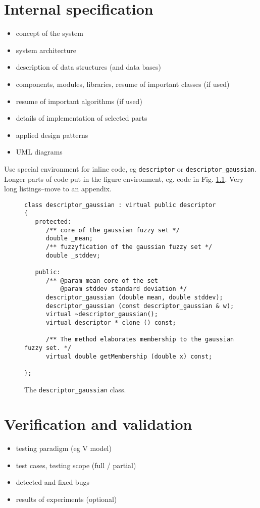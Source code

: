 \documentclass[a4paper,twoside,12pt]{book}
\begin{document}
\chapter{Internal specification}

\begin{itemize}
\item concept of the system
\item system architecture
\item description of data structures (and data bases)
\item components, modules, libraries, resume of important classes (if used)
\item resume of important algorithms (if used)
\item details of implementation of selected parts
\item applied design patterns
\item UML diagrams
\end{itemize}


Use special environment for inline code, eg \lstinline|descriptor| or \lstinline|descriptor_gaussian|.
Longer parts of code put in the figure environment, eg. code in Fig. \ref{fig:pseudokod}. Very long listings–move to an appendix.

\begin{figure}
\centering
\begin{lstlisting}
class descriptor_gaussian : virtual public descriptor
{
   protected:
      /** core of the gaussian fuzzy set */
      double _mean;
      /** fuzzyfication of the gaussian fuzzy set */
      double _stddev;

   public:
      /** @param mean core of the set
          @param stddev standard deviation */
      descriptor_gaussian (double mean, double stddev);
      descriptor_gaussian (const descriptor_gaussian & w);
      virtual ~descriptor_gaussian();
      virtual descriptor * clone () const;

      /** The method elaborates membership to the gaussian fuzzy set. */
      virtual double getMembership (double x) const;

};
\end{lstlisting}
\caption{The \lstinline|descriptor_gaussian| class.}
\label{fig:pseudokod}
\end{figure}


\chapter{Verification and validation}
\begin{itemize}
\item testing paradigm (eg V model)
\item test cases, testing scope (full / partial)
\item detected and fixed bugs
\item results of experiments (optional)
\end{itemize}
\end{document}
